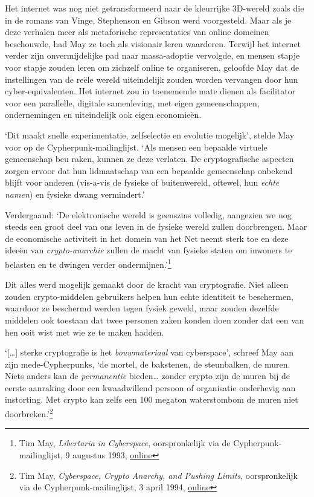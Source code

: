 \documentclass[
  a5paper,
  smalldemyvopaper,11pt,twoside,onecolumn,openright,extrafontsizes,
hidelinks]{memoir}
\begin{document}
Het internet was nog niet getransformeerd naar de kleurrijke 3D-wereld
zoals die in de romans van Vinge, Stephenson en Gibson werd voorgesteld.
Maar als je deze verhalen meer als metaforische representaties van
online domeinen beschouwde, had May ze toch als visionair leren
waarderen. Terwijl het internet verder zijn onvermijdelijke pad naar
massa-adoptie vervolgde, en mensen stapje voor stapje zouden leren om
zichzelf online te organiseren, geloofde May dat de instellingen van de
reële wereld uiteindelijk zouden worden vervangen door hun
cyber-equivalenten. Het internet zou in toenemende mate dienen als
facilitator voor een parallelle, digitale samenleving, met eigen
gemeenschappen, ondernemingen en uiteindelijk ook eigen economieën.

`Dit maakt snelle experimentatie, zelfselectie en evolutie mogelijk',
stelde May voor op de Cypherpunk-mailinglijst. `Als mensen een bepaalde
virtuele gemeenschap beu raken, kunnen ze deze verlaten. De
cryptografische aspecten zorgen ervoor dat hun lidmaatschap van een
bepaalde gemeenschap onbekend blijft voor anderen (vis-a-vis de fysieke
of buitenwereld, oftewel, hun \emph{echte namen}) en fysieke dwang
vermindert.'

Verdergaand: `De elektronische wereld is geenszins volledig, aangezien
we nog steeds een groot deel van ons leven in de fysieke wereld zullen
doorbrengen. Maar de economische activiteit in het domein van het Net
neemt sterk toe en deze ideeën van \emph{crypto-anarchie} zullen de
macht van fysieke staten om inwoners te belasten en te dwingen verder
ondermijnen.'\footnote{Tim May, \emph{Libertaria in Cyberspace},
  oorspronkelijk via de Cypherpunk-mailinglijst, 9 augustus 1993,
  \href{https://cypherpunks.venona.com/date/1993/08/msg00168.html}{online}}

Dit alles werd mogelijk gemaakt door de kracht van cryptografie. Niet
alleen zouden crypto-middelen gebruikers helpen hun echte identiteit te
beschermen, waardoor ze beschermd werden tegen fysiek geweld, maar
zouden dezelfde middelen ook toestaan dat twee personen zaken konden
doen zonder dat een van hen ooit wist met wie ze te maken hadden.

`{[}\ldots{]} sterke cryptografie is het \emph{bouwmateriaal} van
cyberspace', schreef May aan zijn mede-Cypherpunks, `de mortel, de
bakstenen, de steunbalken, de muren. Niets anders kan de
\emph{permanentie} bieden\ldots{} zonder crypto zijn de muren bij de
eerste aanraking door een kwaadwillend persoon of organisatie onderhevig
aan instorting. Met crypto kan zelfs een 100 megaton waterstombom de
muren niet doorbreken.'\footnote{Tim May, \emph{Cyberspace, Crypto
  Anarchy, and Pushing Limits}, oorspronkelijk via de
  Cypherpunk-mailinglijst, 3 april 1994,
  \href{https://cypherpunks.venona.com/date/1994/04/msg00096.html}{online}}
\end{document}
